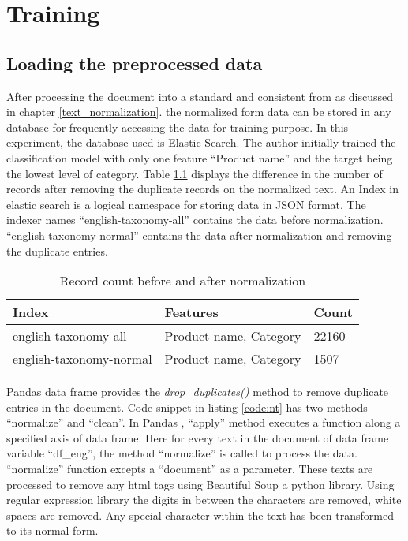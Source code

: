 \chapter{Training}

\section{Loading the preprocessed data}

After processing the document into a standard and consistent from as discussed in chapter \ref{text_normalization}. the normalized form data can be stored in any database for frequently accessing the data for training purpose. In this experiment, the database used is Elastic Search. The author initially trained the classification model with only one feature ``Product name'' and the target being the lowest level of category.
Table \ref{table:AfterNormal} displays the difference in the number of records after removing the duplicate records on the normalized text. An Index in elastic search is a logical namespace for storing data in JSON format. The indexer names ``english-taxonomy-all'' contains the data before normalization. ``english-taxonomy-normal'' contains the data after normalization and removing the duplicate entries.

\begin{table}[H]
    \centering
    \caption{Record count before and after normalization}
    \label{table:AfterNormal}
    \begin{tabular}{ lll }
          \toprule
          
          \textbf{Index}& \textbf{Features} & \textbf{Count}\\
          \midrule
          english-taxonomy-all&Product name, Category & 22160\\
          english-taxonomy-normal&Product name, Category & 1507\\
          
          \bottomrule
          \end{tabular}
\end{table}

Pandas data frame \parencite{mckinney-proc-scipy-2010} provides the \textit{drop\_duplicates()} method to remove duplicate entries in the document. Code snippet in listing \ref{code:nt} has two methods ``normalize'' and ``clean''. In Pandas \parencite{mckinney-proc-scipy-2010}, ``apply'' method executes a function along a specified axis of data frame. Here for every text in the document of data frame variable ``df\_eng'', the method ``normalize'' is called to process the data. ``normalize'' function excepts a ``document'' as a parameter.  These texts are processed to remove any html tags using Beautiful Soup a python library. Using regular expression library the digits in between the characters are removed, white spaces are removed. Any special character within the text has been transformed to its normal form.

